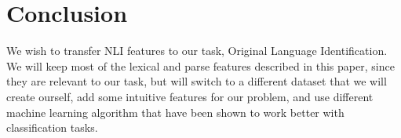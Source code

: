 \documentclass[10pt]{article}
\begin{document}
\section{Conclusion}
We wish to transfer NLI features to our task, Original Language Identification. We will keep most of the lexical and parse features described in this paper, since they are relevant to our task, but will switch to a different dataset that we will create ourself, add some intuitive features for our problem, and use different machine learning algorithm that have been shown to work better with classification tasks.



\end{document}

